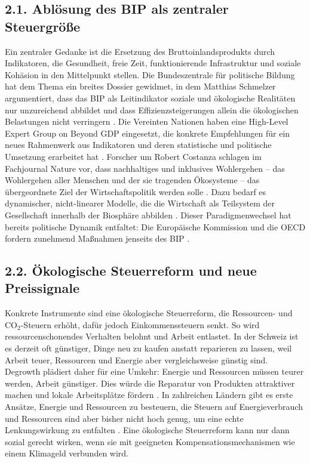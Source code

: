 \documentclass[12pt, a4paper]{article}
\begin{document}
	\subsection*{2.1. Ablösung des BIP als zentraler Steuergröße}
	Ein zentraler Gedanke ist die Ersetzung des Bruttoinlandsprodukts durch Indikatoren,
	die Gesundheit, freie Zeit, funktionierende Infrastruktur und soziale Kohäsion in den
	Mittelpunkt stellen. Die Bundeszentrale für politische Bildung hat dem Thema ein
	breites Dossier gewidmet, in dem Matthias Schmelzer argumentiert, dass das BIP als
	Leitindikator soziale und ökologische Realitäten nur unzureichend abbildet und dass
	Effizienzsteigerungen allein die ökologischen Belastungen nicht verringern
	\cite{bpb2025}. Die Vereinten Nationen haben eine High-Level Expert Group on Beyond
	GDP eingesetzt, die konkrete Empfehlungen für ein neues Rahmenwerk aus Indikatoren
	und deren statistische und politische Umsetzung erarbeitet hat \cite{un2025}. Forscher
	um Robert Costanza schlagen im Fachjournal Nature vor, dass nachhaltiges und
	inklusives Wohlergehen – das Wohlergehen aller Menschen und der sie tragenden
	Ökosysteme – das übergeordnete Ziel der Wirtschaftspolitik werden solle
	\cite{nature2025}. Dazu bedarf es dynamischer, nicht-linearer Modelle, die die
	Wirtschaft als Teilsystem der Gesellschaft innerhalb der Biosphäre abbilden
	\cite{nature2025}. Dieser Paradigmenwechsel hat bereits politische Dynamik entfaltet:
	Die Europäische Kommission und die OECD fordern zunehmend Maßnahmen jenseits des BIP
	\cite{nature2025}.
	
	\subsection*{2.2. Ökologische Steuerreform und neue Preissignale}
	Konkrete Instrumente sind eine ökologische Steuerreform, die Ressourcen- und
	CO$_2$-Steuern erhöht, dafür jedoch Einkommenssteuern senkt. So wird ressourcenschonendes
	Verhalten belohnt und Arbeit entlastet. In der Schweiz ist es derzeit oft günstiger,
	Dinge neu zu kaufen anstatt reparieren zu lassen, weil Arbeit teuer, Ressourcen und
	Energie aber vergleichsweise günstig sind. Degrowth plädiert daher für eine Umkehr:
	Energie und Ressourcen müssen teurer werden, Arbeit günstiger. Dies würde die
	Reparatur von Produkten attraktiver machen und lokale Arbeitsplätze fördern
	\cite{tsri2025}. In zahlreichen Ländern gibt es erste Ansätze, Energie und
	Ressourcen zu besteuern, die Steuern auf Energieverbrauch und Ressourcen sind aber
	bisher nicht hoch genug, um eine echte Lenkungswirkung zu entfalten \cite{tsri2025}.
	Eine ökologische Steuerreform kann nur dann sozial gerecht wirken, wenn sie mit
	geeigneten Kompensationsmechanismen wie einem Klimageld verbunden wird.
	
\end{document}
